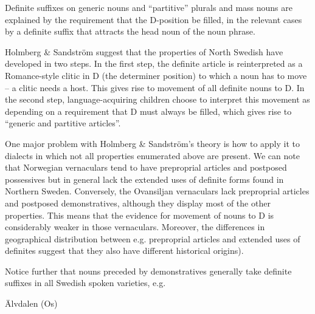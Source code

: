 \begin{styleBodytextC}
Definite suffixes on generic nouns and “partitive” plurals and mass nouns are explained by the requirement that the D-position be filled, in the relevant cases by a definite suffix that attracts the head noun of the noun phrase. 

\end{styleBodytextC}

\begin{styleBodytextC}
Holmberg \& Sandström suggest that the properties of North Swedish have developed in two steps. In the first step, the definite article is reinterpreted as a Romance-style clitic in D (the determiner position) to which a noun has to move – a clitic needs a host. This gives rise to movement of all definite nouns to D. In the second step, language-acquiring children choose to interpret this movement as depending on a requirement that D must always be filled, which gives rise to “generic and partitive articles”. 

\end{styleBodytextC}

\begin{styleBodytextC}
One major problem with Holmberg \& Sandström’s theory is how to apply it to dialects in which not all properties enumerated above are present. We can note that Norwegian vernaculars tend to have preproprial articles and postposed possessives but in general lack the extended uses of definite forms found in Northern Sweden. Conversely, the Ovansiljan vernaculars lack preproprial articles and postposed demonstratives, although they display most of the other properties. This means that the evidence for movement of nouns to D is considerably weaker in those vernaculars. Moreover, the differences in geographical distribution between e.g. preproprial articles and extended uses of definites suggest that they also have different historical origins). 

\end{styleBodytextC}

\begin{styleBodytextC}
Notice further that nouns preceded by demonstratives generally take definite suffixes in all Swedish spoken varieties, e.g.

\end{styleBodytextC}

\begin{listWWNumileveli}
\item 

\begin{styleExample}
Älvdalen (Os)

\end{styleExample}

\end{listWWNumileveli}

